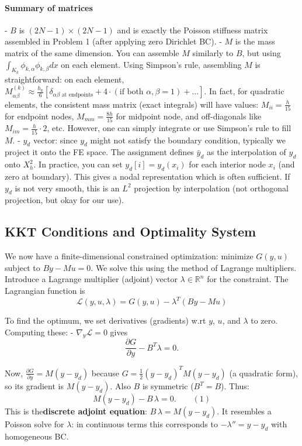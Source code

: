 \paragraph{Summary of matrices}
- \(B\) is \((2N-1)\times(2N-1)\) and is exactly the Poisson stiffness matrix assembled in Problem 1 (after applying zero Dirichlet BC).
- \(M\) is the mass matrix of the same dimension. You can assemble \(M\) similarly to \(B\), but using \(\int_{K_k} \phi_{k,\alpha}\phi_{k,\beta} dx\) on each element. Using Simpson's rule, assembling \(M\) is straightforward: on each element, \(M^{(k)}_{\alpha\beta} \approx \frac{h_k}{6} [\delta_{\alpha\beta \text{ at endpoints}} + 4\cdot (\text{if both }\alpha,\beta=1) + ...]\).
In fact, for quadratic elements, the consistent mass matrix (exact integrals) will have values: \(M_{ii} = \frac{h}{15}\) for endpoint nodes, \(M_{mm}=\frac{8h}{15}\) for midpoint node, and off-diagonals like \(M_{im} = \frac{h}{15}\cdot 2\), etc. However, one can simply integrate or use Simpson's rule to fill \(M\).
- \(y_d\) vector: since \(y_d\) might not satisfy the boundary condition, typically we project it onto the FE space. The assignment defines \(\bar{y}_d\) as the interpolation of \(y_d\) onto \(X_h^2\). In practice, you can set \(y_d[i] = y_d(x_i)\) for each interior node \(x_i\) (and zero at boundary). This gives a nodal representation which is often sufficient. If \(y_d\) is not very smooth, this is an \(L^2\) projection by interpolation (not orthogonal projection, but okay for our use).

\subsection{KKT Conditions and Optimality System}
We now have a finite-dimensional constrained optimization: minimize \(G(y,u)\) subject to \(B y - M u = 0\). We solve this using the method of Lagrange multipliers.
Introduce a Lagrange multiplier (adjoint) vector \(\lambda \in \mathbb{R}^n\) for the constraint. The Lagrangian function is
\[\mathcal{L}(y,u,\lambda) = G(y,u) - \lambda^T (B y - M u)\]

To find the optimum, we set derivatives (gradients) w.rt \(y\), \(u\), and \(\lambda\) to zero.
Computing these:
- \(\nabla_y \mathcal{L} = 0\) gives
\[\frac{\partial G}{\partial y} - B^T \lambda = 0.\]

Now, \(\frac{\partial G}{\partial y} = M(y - y_d)\) because \(G = \frac{1}{2}(y-y_d)^T M (y-y_d)\) (a quadratic form), so its gradient is \(M(y - y_d)\). Also \(B\) is symmetric (\(B^T = B\)). Thus:
\[M (y - y_d) - B\,\lambda = 0. \qquad (1)\]
This is the\textbf{discrete adjoint equation}: \(B\,\lambda = M (y - y_d)\). It resembles a Poisson solve for \(\lambda\): in continuous terms this corresponds to \(- \lambda'' = y - y_d\) with homogeneous BC.

